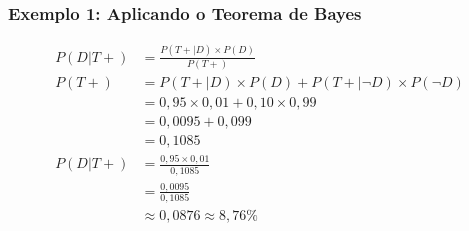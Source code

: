 \documentclass[11pt]{beamer}
\begin{document}
\begin{frame}
\frametitle{Exemplo 1: Aplicando o Teorema de Bayes}
\begin{align*}
P(D|T+) &= \frac{P(T+|D) \times P(D)}{P(T+)} \\[10pt]
P(T+) &= P(T+|D) \times P(D) + P(T+|\neg D) \times P(\neg D) \\
&= 0,95 \times 0,01 + 0,10 \times 0,99 \\
&= 0,0095 + 0,099 \\
&= 0,1085 \\[10pt]
P(D|T+) &= \frac{0,95 \times 0,01}{0,1085} \\
&= \frac{0,0095}{0,1085} \\
&\approx 0,0876 \approx 8,76\%
\end{align*}
\end{frame}



\end{document}
